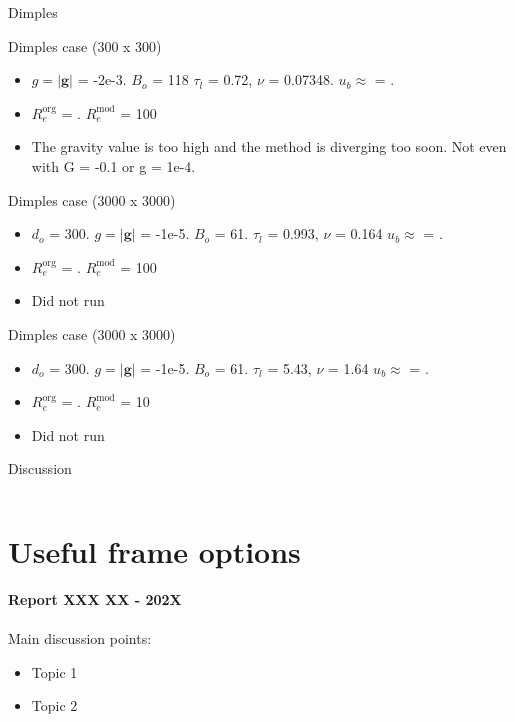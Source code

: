 \documentclass[8pt]{beamer}
\begin{document}
	\begin{frame}[t]{Dimples}
			
		Dimples case (300 x 300)
		\begin{itemize}
			\item $g = \vert \mathbf{g}\vert $ = -2e-3. $B_o$ = 118 $\tau_l$ = 0.72, $\nu$ = 0.07348. $u_b \approx$ = . 
			\item $R_e^{\text{org}}$ = . $R_e^{\text{mod}}$ = 100
			\item The gravity value is too high and the method is diverging too soon. Not even with G = -0.1 or g = 1e-4.
		\end{itemize}	
	
		Dimples case (3000 x 3000)
		\begin{itemize}
		\item $d_o$ = 300. $g = \vert \mathbf{g}\vert $ = -1e-5. $B_o$ = 61. $\tau_l$ = 0.993, $\nu$ = 0.164 $u_b \approx$ = . 
		\item $R_e^{\text{org}}$ = . $R_e^{\text{mod}}$ = 100
		\item Did not run
	\end{itemize}	
	Dimples case (3000 x 3000)
		\begin{itemize}
			\item $d_o$ = 300. $g = \vert \mathbf{g}\vert $ = -1e-5. $B_o$ = 61. $\tau_l$ = 5.43, $\nu$ = 1.64 $u_b \approx$ = . 
			\item $R_e^{\text{org}}$ = . $R_e^{\text{mod}}$ = 10
			\item Did not run
		\end{itemize}		
	\end{frame}

	\begin{frame}{Discussion}
	\begin{columns}
		
		
		
		
	\end{columns}
	\end{frame}



	\section*{Useful frame options}
	\label{}
	\justifying
	\begin{frame}
		\textbf{Report XXX XX - 202X}\\~\\
		Main discussion points:
		\begin{itemize}
			\item Topic 1
			\item Topic 2
		\end{itemize}
	\end{frame}
\end{document}
